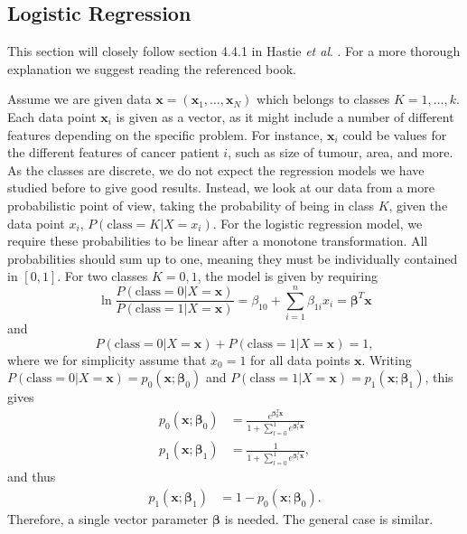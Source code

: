 \documentclass[aps,reprint,superscriptaddress,nofootinbib]{revtex4-2}
\begin{document}
\subsection*{Logistic Regression}
This section will closely follow section 4.4.1 in Hastie \textit{et al}. \cite{hastie}. For a more thorough explanation we suggest reading the referenced book.

Assume we are given data \(\bm{x} = (\bm{x}_1,\ldots,\bm{x}_N)\) which belongs to classes \(K=1,\ldots,k\). Each data point \(\bm{x}_i\) is given as a vector, as it might include a number of different features depending on the specific problem. For instance, \(\bm{x}_i\) could be values for the different features of cancer patient \(i\), such as size of tumour, area, and more. As the classes are discrete, we do not expect the regression models we have studied before to give good results. Instead, we look at our data from a more probabilistic point of view, taking the probability of being in class \(K\), given the data point \(x_i\), \(P(\text{class}=K|X=x_i)\). For the logistic regression model, we require these probabilities to be linear after a monotone transformation. All probabilities should sum up to one, meaning they must be individually contained in \([0,1]\).
For two classes \(K=0,1\), the model is given by requiring
\begin{equation*}
    \ln\frac{P(\text{class}=0|X=\bm{x})}{P(\text{class}=1|X=\bm{x})} = \beta_{10}+\sum_{i=1}^n\beta_{1i}x_i=\bm{\beta}^T\bm{x}
\end{equation*}
and
\begin{equation*}
    P(\text{class}=0|X=\bm{x}) + P(\text{class}=1|X=\bm{x}) = 1,
\end{equation*}
where we for simplicity assume that \(x_0=1\) for all data points \(\bm{x}\). Writing \(P(\text{class}=0|X=\bm{x})=p_0(\bm{x};\bm{\beta}_0)\) and \(P(\text{class}=1|X=\bm{x})=p_1(\bm{x};\bm{\beta}_1)\), this gives
\begin{align*}
    p_0(\bm x;\bm \beta_0) &= \frac{e^{\bm{\beta}_0^T\bm{x}}}{1+\sum_{l=0}^1e^{\bm{\beta}_l^T\bm{x}}}
    \\
    p_1(\bm x;\bm \beta_1) &= \frac{1}{1+\sum_{l=0}^1e^{\bm{\beta}_l^T\bm{x}}},
\end{align*}
and thus
\begin{align*}
    p_1(\bm{x}; \bm\beta_1) &= 1-p_0(\bm{x};\bm{\beta}_0).
\end{align*}
Therefore, a single vector parameter \(\bm{\beta}\) is needed. The general case is similar.
\end{document}
